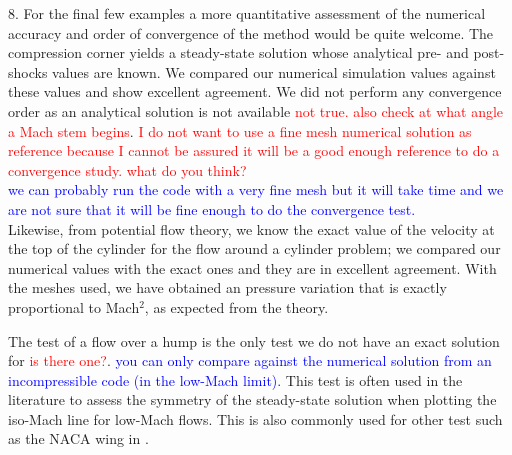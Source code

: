 \documentclass{article}
\newcommand{\tcr}[1]{\textcolor{red}{#1}}
\newcommand{\tcb}[1]{\textcolor{blue}{#1}}
\begin{document}
{
\color{blue}
8. For the final few examples a more quantitative assessment of the
numerical accuracy and order of convergence of the method would be
quite welcome.
}
The compression corner yields a steady-state solution whose analytical pre- and post-shocks values are known. 
We compared our numerical simulation values against these values and show excellent agreement. 
We did not perform any convergence order as an analytical solution is not available \tcr{not true. also check at what angle a Mach stem begins}. 
\tcr{I do not want to use a fine mesh numerical solution as reference because I cannot be assured it will be a good
enough reference to do a convergence study. what do you think?\\} \tcb{we can probably run the code with a very fine mesh but it will take time and we are not sure that it will be fine enough to do the convergence test.\\}
Likewise, from potential flow theory, we know the exact value of the velocity at the top of the cylinder for the flow around a 
cylinder problem; we compared our numerical values with the exact ones and they are in excellent agreement.
With the meshes used, we have obtained an pressure variation that is exactly proportional to Mach$^2$, as expected from the theory.

The test of a flow over a hump is the only test we do not have an exact solution for \tcr{is there one?}. \tcb{you can only compare against the numerical solution from an incompressible code (in the low-Mach limit).}
This test is often used in the literature to assess the symmetry of the steady-state solution when plotting the iso-Mach line 
for low-Mach flows. This is also commonly used for other test such as the NACA wing in \cite{LowMach1}.
\bigskip


\end{document}
